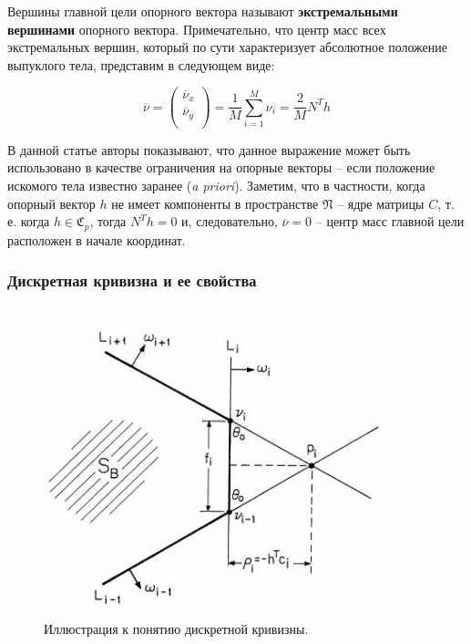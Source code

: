 \documentclass[a4paper,12pt, titlepage]{article}
\begin{document}
Вершины главной цели опорного вектора называют \textbf{экстремальными вершинами}
опорного вектора. Примечательно, что центр масс всех экстремальных вершин,
который по сути характеризует абсолютное положение выпуклого тела, представим
в следующем виде:

$$
\overline{\nu} = \left(
  \begin{array}{c}
   \overline{\nu}_{x} \\
   \overline{\nu}_{y} \\
  \end{array}
  \right) =
  \frac{1}{M} \sum\limits_{i = 1}^{M} \nu_{i} = \frac{2}{M} N^{T} h
$$

В данной статье авторы показывают, что данное выражение может быть использовано
в качестве ограничения на опорные векторы -- если положение искомого тела
известно заранее (\textit{a priori}). Заметим, что в частности, когда опорный
вектор $h$ не имеет компоненты в пространстве $\mathfrak{N}$ -- ядре матрицы
$C$, т. е. когда $h \in \mathfrak{C}_{p}$, тогда $N^{T} h = 0$ и, следовательно,
$\overline{\nu} = 0$ -- центр масс главной цели расположен в начале координат.

\subsubsection{Дискретная кривизна и ее свойства}

\begin{figure}[ht]
    \includegraphics[width=10cm]{images/dicrete-radius-curvature.jpg}
    \caption{Иллюстрация к понятию дискретной кривизны.}
    \label{dicrete-radius-curvature}
\end{figure}
\end{document}
